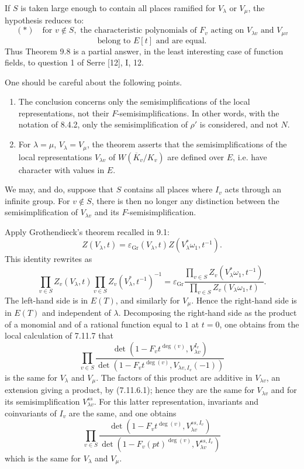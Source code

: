 \documentclass[10pt]{article}
\begin{document}
If $S$ is taken large enough to contain all places ramified for $V_\lambda$ or $V_\mu$, the hypothesis reduces to:
\[
(*)\quad
\text{for }v\notin S,\text{ the characteristic polynomials of }F_v
\text{ acting on }V_{\lambda v}\text{ and }V_{\mu v}
\]
\[
\text{belong to }E[t]\text{ and are equal.}
\]
Thus Theorem 9.8 is a partial answer, in the least interesting case of function fields, to question 1 of Serre [12], I, 12.

One should be careful about the following points.
\begin{enumerate}[label=(\alph*)]
\item The conclusion concerns only the semisimplifications of the local representations, not their $F$-semisimplifications. In other words, with the notation of 8.4.2, only the semisimplification of $\rho'$ is considered, and not $N$.
\item For $\lambda=\mu$, $V_\lambda=V_\mu$, the theorem asserts that the semisimplifications of the local representations $V_{\lambda v}$ of $W(\overline K_v/K_v)$ are defined over $E$, i.e. have character with values in $E$.
\end{enumerate}
We may, and do, suppose that $S$ contains all places where $I_v$ acts through an infinite group. For $v\notin S$, there is then no longer any distinction between the semisimplification of $V_{\lambda v}$ and its $F$-semisimplification.

Apply Grothendieck's theorem recalled in 9.1:
\[
Z(V_\lambda,t)=\varepsilon_{\mathrm{Gr}}(V_\lambda,t)Z(V_\lambda^*\omega_1,t^{-1}).
\]
This identity rewrites as
\[
\prod_{v\in S}Z_v(V_\lambda,t)\prod_{v\in S}Z_v(V_\lambda^*,t^{-1})^{-1}
=
\varepsilon_{\mathrm{Gr}}
\frac{\prod_{v\in S}Z_v(V_\lambda^*\omega_1,t^{-1})}
{\prod_{v\in S}Z_v(V_\lambda\omega_1,t)}.
\]
The left-hand side is in $E(T)$, and similarly for $V_\mu$. Hence the right-hand side is in $E(T)$ and independent of $\lambda$. Decomposing the right-hand side as the product of a monomial and of a rational function equal to $1$ at $t=0$, one obtains from the local calculation of 7.11.7 that
\[
\prod_{v\in S}
\frac{\det(1-F_vt^{\deg(v)},V_{\lambda v}^{I_v})}
{\det(1-F_vt^{\deg(v)},V_{\lambda v,I_v}(-1))}
\]
is the same for $V_\lambda$ and $V_\mu$. The factors of this product are additive in $V_{\lambda v}$, an extension giving a product, by (7.11.6.1); hence they are the same for $V_{\lambda v}$ and for its semisimplification $V_{\lambda v}^{ss}$. For this latter representation, invariants and coinvariants of $I_v$ are the same, and one obtains
\[
\tag{9.8.1}
\prod_{v\in S}
\frac{\det(1-F_vt^{\deg(v)},V_{\lambda v}^{ss,I_v})}
{\det(1-F_v(pt)^{\deg(v)},V_{\lambda v}^{ss,I_v})}
\]
which is the same for $V_\lambda$ and $V_\mu$.
\end{document}
